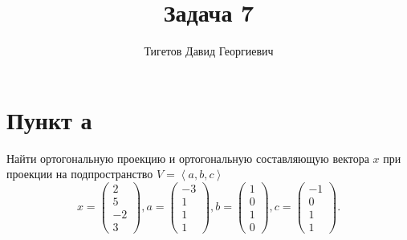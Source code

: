 \documentclass[12pt]{article}
\begin{document}
    \title{Задача 7}
    \author{Тигетов Давид Георгиевич}
    \date{}
    \maketitle

    \section*{Пункт а}
    Найти ортогональную проекцию и ортогональную составляющую вектора $x$ при проекции на подпространство $V = \left < a, b, c \right >$
    \[
        x =
        \begin{pmatrix}
            2 \\ 5 \\ -2 \\ 3
        \end{pmatrix},
        a =
        \begin{pmatrix}
            -3 \\ 1 \\ 1 \\ 1
        \end{pmatrix},
        b =
        \begin{pmatrix}
            1 \\ 0 \\ 1 \\ 0
        \end{pmatrix},
        c =
        \begin{pmatrix}
            -1 \\ 0 \\ 1 \\ 1
        \end{pmatrix} .
    \]
\end{document}
